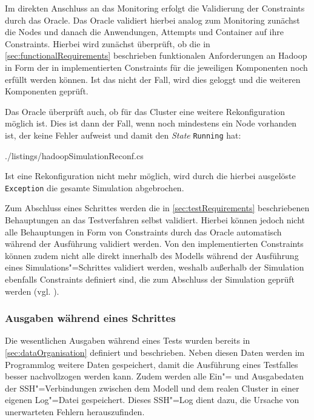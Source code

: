 Im direkten Anschluss an das Monitoring erfolgt die Validierung der Constraints durch das Oracle.
Das Oracle validiert hierbei analog zum Monitoring zunächst die Nodes und danach die Anwendungen, Attempts und Container auf ihre Constraints.
Hierbei wird zunächst überprüft, ob die in \autoref{sec:functionalRequirements} beschrieben funktionalen Anforderungen an Hadoop in Form der in  implementierten Constraints für die jeweiligen Komponenten noch erfüllt werden können.
Ist das nicht der Fall, wird dies geloggt und die weiteren Komponenten geprüft.

Das Oracle überprüft auch, ob für das Cluster eine weitere Rekonfiguration möglich ist.
Dies ist dann der Fall, wenn noch mindestens ein Node vorhanden ist, der keine Fehler aufweist und damit den \emph{State} \texttt{Running} hat:


{./listings/hadoopSimulationReconf.cs}

Ist eine Rekonfiguration nicht mehr möglich, wird durch die hierbei ausgelöste \texttt{Exception} die gesamte Simulation abgebrochen.

Zum Abschluss eines Schrittes werden die in \autoref{sec:testRequirements} beschriebenen Behauptungen an das Testverfahren selbst validiert.
Hierbei können jedoch nicht alle Behauptungen in Form von Constraints durch das Oracle automatisch während der Ausführung validiert werden.
Von den implementierten Constraints können zudem nicht alle direkt innerhalb des Modells während der Ausführung eines Simulations"=Schrittes validiert werden, weshalb außerhalb der Simulation ebenfalls Constraints definiert sind, die zum Abschluss der Simulation geprüft werden (vgl. ).

\subsubsection{Ausgaben während eines Schrittes}
\label{sec:simulationStepOutput}

Die wesentlichen Ausgaben während eines Tests wurden bereits in \autoref{sec:dataOrganisation} definiert und beschrieben.
Neben diesen Daten werden im Programmlog weitere Daten gespeichert, damit die Ausführung eines Testfalles besser nachvollzogen werden kann.
Zudem werden alle Ein"= und Ausgabedaten der SSH"=Verbindungen zwischen dem Modell und dem realen Cluster in einer eigenen Log"=Datei gespeichert.
Dieses SSH"=Log dient dazu, die Ursache von unerwarteten Fehlern herauszufinden.

